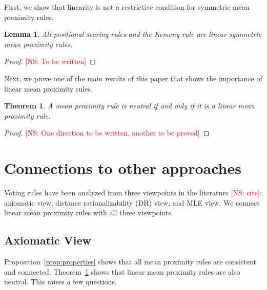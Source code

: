\documentclass[10pt,letterpaper]{article}
\newtheorem{theorem}{Theorem}
\newtheorem{lemma}{Lemma}
\newcommand{\kibitz}[2]{\ifnum\Comments=1\textcolor{#1}{#2}\fi}
\newcommand{\cns}[1]{\kibitz{red} {[NS: #1]}}
\begin{document}

First, we show that linearity is not a restrictive condition for symmetric mean proximity rules.

\begin{lemma}
All positional scoring rules and the Kemeny rule are linear symmetric mean proximity rules.
\label{lem:linear-captures}
\end{lemma}
\begin{proof}
\cns{To be written}
\end{proof}

Next, we prove one of the main results of this paper that shows the importance of linear mean proximity rules. 
\begin{theorem}
A mean proximity rule is neutral if and only if it is a linear mean proximity rule. 
\label{thm:linear-neutral}
\end{theorem}
\begin{proof}
\cns{One direction to be written, another to be proved}
\end{proof}



\section{Connections to other approaches}
Voting rules have been analyzed from three viewpoints in the literature \cns{cite}: axiomatic view, distance rationalizability (DR) view, and MLE view. We connect linear mean proximity rules with all three viewpoints.


\subsection{Axiomatic View}
Proposition~\ref{prop:properties} shows that all mean proximity rules are consistent and connected. Theorem~\ref{thm:linear-neutral} shows that linear mean proximity rules are also neutral. This raises a few questions.
\end{document}
